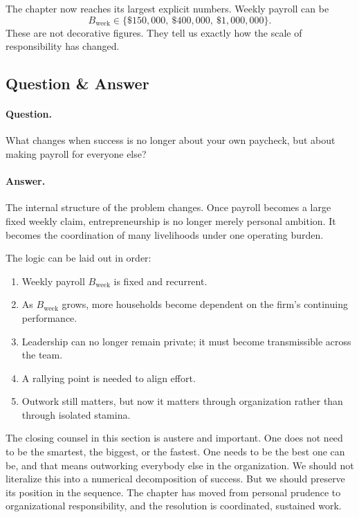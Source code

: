 The chapter now reaches its largest explicit numbers. Weekly payroll can be
\begin{equation}
B_{\text{week}} \in \{\$150{,}000,\ \$400{,}000,\ \$1{,}000{,}000\}.
\end{equation}
These are not decorative figures. They tell us exactly how the scale of responsibility has changed.

\subsection{Question \& Answer}

\paragraph{Question.} What changes when success is no longer about your own paycheck, but about making payroll for everyone else?

\paragraph{Answer.} The internal structure of the problem changes. Once payroll becomes a large fixed weekly claim, entrepreneurship is no longer merely personal ambition. It becomes the coordination of many livelihoods under one operating burden.

The logic can be laid out in order:
\begin{enumerate}
\item Weekly payroll \(B_{\text{week}}\) is fixed and recurrent.
\item As \(B_{\text{week}}\) grows, more households become dependent on the firm's continuing performance.
\item Leadership can no longer remain private; it must become transmissible across the team.
\item A rallying point is needed to align effort.
\item Outwork still matters, but now it matters through organization rather than through isolated stamina.
\end{enumerate}

The closing counsel in this section is austere and important. One does not need to be the smartest, the biggest, or the fastest. One needs to be the best one can be, and that means outworking everybody else in the organization. We should not literalize this into a numerical decomposition of success. But we should preserve its position in the sequence. The chapter has moved from personal prudence to organizational responsibility, and the resolution is coordinated, sustained work.

